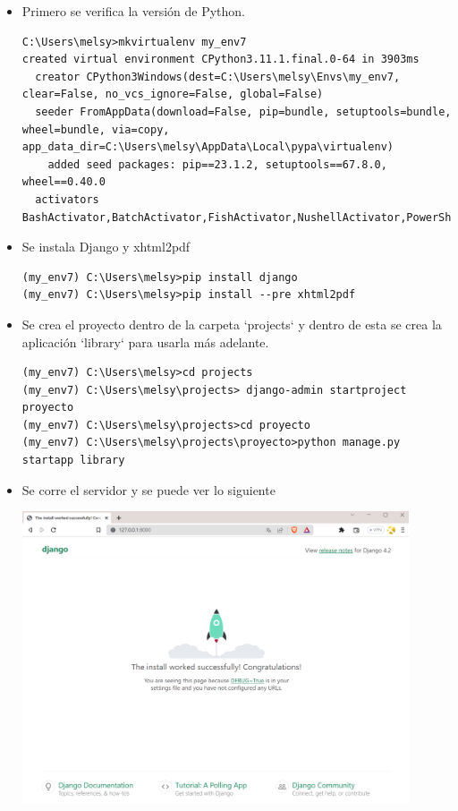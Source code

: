 \documentclass{article}
\begin{document}
\begin{itemize}
\item Primero se verifica la versión de Python.

\begin{lstlisting}[style=shell]
C:\Users\melsy>mkvirtualenv my_env7
created virtual environment CPython3.11.1.final.0-64 in 3903ms
  creator CPython3Windows(dest=C:\Users\melsy\Envs\my_env7, clear=False, no_vcs_ignore=False, global=False)
  seeder FromAppData(download=False, pip=bundle, setuptools=bundle, wheel=bundle, via=copy, app_data_dir=C:\Users\melsy\AppData\Local\pypa\virtualenv)
    added seed packages: pip==23.1.2, setuptools==67.8.0, wheel==0.40.0
  activators BashActivator,BatchActivator,FishActivator,NushellActivator,PowerShellActivator,PythonActivator
\end{lstlisting}

\item Se instala Django y xhtml2pdf

\begin{lstlisting}[style=shell]
(my_env7) C:\Users\melsy>pip install django
(my_env7) C:\Users\melsy>pip install --pre xhtml2pdf
\end{lstlisting}

\item Se crea el proyecto dentro de la carpeta `projects` y dentro de esta se crea la aplicación `library` para usarla más adelante.

\begin{lstlisting}[style=shell]
(my_env7) C:\Users\melsy>cd projects
(my_env7) C:\Users\melsy\projects> django-admin startproject proyecto
(my_env7) C:\Users\melsy\projects>cd proyecto
(my_env7) C:\Users\melsy\projects\proyecto>python manage.py startapp library
\end{lstlisting}

\item Se corre el servidor y se puede ver lo siguiente

\begin{minipage}{\linewidth}
  \centering
  \includegraphics[width=0.90\textwidth]{imagenes/img1.png}
\end{minipage}

\end{itemize}
\end{document}
